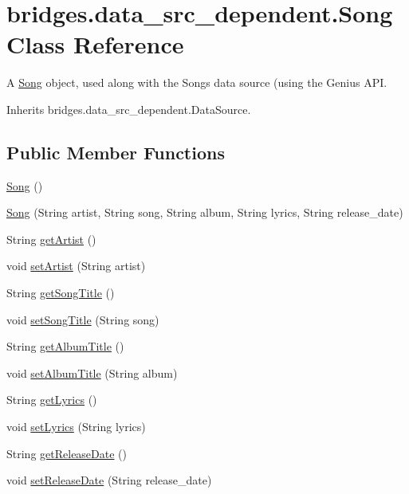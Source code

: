 \hypertarget{classbridges_1_1data__src__dependent_1_1_song}{}\section{bridges.\+data\+\_\+src\+\_\+dependent.\+Song Class Reference}
\label{classbridges_1_1data__src__dependent_1_1_song}


A \mbox{\hyperlink{classbridges_1_1data__src__dependent_1_1_song}{Song}} object, used along with the Songs data source (using the Genius A\+PI.  




Inherits bridges.\+data\+\_\+src\+\_\+dependent.\+Data\+Source.

\subsection*{Public Member Functions}
\begin{DoxyCompactItemize}
\item 
\mbox{\hyperlink{classbridges_1_1data__src__dependent_1_1_song_a824052caca0b9c03d07c42e9e7740020}{Song}} ()
\item 
\mbox{\hyperlink{classbridges_1_1data__src__dependent_1_1_song_a78506e63f4d91dc1f0d821050a093ad6}{Song}} (String artist, String song, String album, String lyrics, String release\+\_\+date)
\item 
String \mbox{\hyperlink{classbridges_1_1data__src__dependent_1_1_song_a7aa3685df74e4fbb5e0d4d4750cf7685}{get\+Artist}} ()
\item 
void \mbox{\hyperlink{classbridges_1_1data__src__dependent_1_1_song_adffaec742bf945ec8c81244fdafd47d2}{set\+Artist}} (String artist)
\item 
String \mbox{\hyperlink{classbridges_1_1data__src__dependent_1_1_song_a4e7b8aed1aec243f2798a30e51091d72}{get\+Song\+Title}} ()
\item 
void \mbox{\hyperlink{classbridges_1_1data__src__dependent_1_1_song_a9d7540c0e6cca53ae3a105885aac5622}{set\+Song\+Title}} (String song)
\item 
String \mbox{\hyperlink{classbridges_1_1data__src__dependent_1_1_song_a94b26a355aa1e30938bcc896a8bd902f}{get\+Album\+Title}} ()
\item 
void \mbox{\hyperlink{classbridges_1_1data__src__dependent_1_1_song_ab9f9d24be49c3a0a66c9ff9e271b007e}{set\+Album\+Title}} (String album)
\item 
String \mbox{\hyperlink{classbridges_1_1data__src__dependent_1_1_song_ab4aa2c51f7fdce80d9c178d6f0e0aae8}{get\+Lyrics}} ()
\item 
void \mbox{\hyperlink{classbridges_1_1data__src__dependent_1_1_song_a30889eb971f474e9d62782ddb82c1846}{set\+Lyrics}} (String lyrics)
\item 
String \mbox{\hyperlink{classbridges_1_1data__src__dependent_1_1_song_a05520675a0a2f2e60583887b8c69cde4}{get\+Release\+Date}} ()
\item 
void \mbox{\hyperlink{classbridges_1_1data__src__dependent_1_1_song_a6534e543a295b29858cf98be7a4e276e}{set\+Release\+Date}} (String release\+\_\+date)
\end{DoxyCompactItemize}


